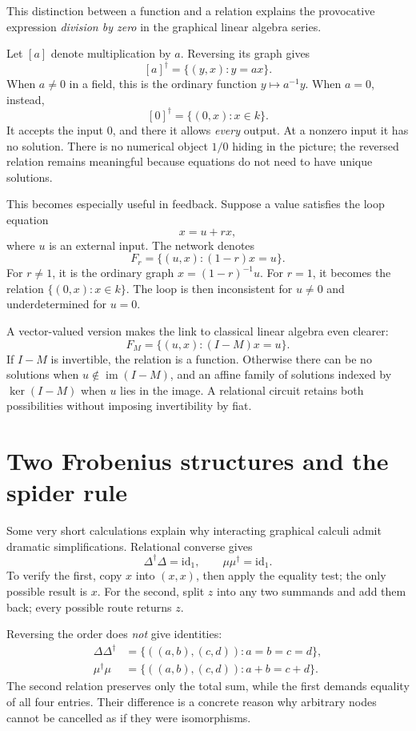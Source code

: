 This distinction between a function and a relation explains the provocative expression \emph{division by zero} in the graphical linear algebra series.

Let \([a]\) denote multiplication by \(a\). Reversing its graph gives
\[
 [a]^\dagger=\{(y,x):y=ax\}.
\]
When \(a\ne0\) in a field, this is the ordinary function \(y\mapsto a^{-1}y\). When \(a=0\), instead,
\[
 \boxed{[0]^\dagger=\{(0,x):x\in k\}.}
\]
It accepts the input \(0\), and there it allows \emph{every} output. At a nonzero input it has no solution. There is no numerical object \(1/0\) hiding in the picture; the reversed relation remains meaningful because equations do not need to have unique solutions.

This becomes especially useful in feedback. Suppose a value satisfies the loop equation
\[
 x=u+rx,
\]
where \(u\) is an external input. The network denotes
\[
 F_r=\{(u,x):(1-r)x=u\}.
\]
For \(r\ne1\), it is the ordinary graph \(x=(1-r)^{-1}u\). For \(r=1\), it becomes the relation \(\{(0,x):x\in k\}\). The loop is then inconsistent for \(u\ne0\) and underdetermined for \(u=0\).

A vector-valued version makes the link to classical linear algebra even clearer:
\[
 F_M=\{(u,x):(I-M)x=u\}.
\]
If \(I-M\) is invertible, the relation is a function. Otherwise there can be no solutions when \(u\notin\operatorname{im}(I-M)\), and an affine family of solutions indexed by \(\ker(I-M)\) when \(u\) lies in the image. A relational circuit retains both possibilities without imposing invertibility by fiat.

\section{Two Frobenius structures and the spider rule}

Some very short calculations explain why interacting graphical calculi admit dramatic simplifications. Relational converse gives
\[
 \boxed{\Delta^\dagger\Delta=\mathrm{id}_1,
 \qquad \mu\mu^\dagger=\mathrm{id}_1.}
\]
To verify the first, copy \(x\) into \((x,x)\), then apply the equality test; the only possible result is \(x\). For the second, split \(z\) into any two summands and add them back; every possible route returns \(z\).

Reversing the order does \emph{not} give identities:
\[
 \begin{aligned}
 \Delta\Delta^\dagger
 &=\{((a,b),(c,d)):a=b=c=d\},\\
 \mu^\dagger\mu
 &=\{((a,b),(c,d)):a+b=c+d\}.
 \end{aligned}
\]
The second relation preserves only the total sum, while the first demands equality of all four entries. Their difference is a concrete reason why arbitrary nodes cannot be cancelled as if they were isomorphisms.

